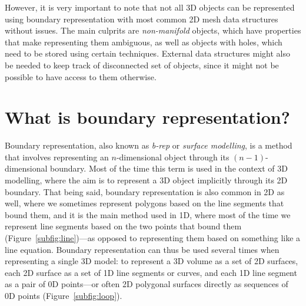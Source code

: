 However, it is very important to note that not all 3D objects can be represented using boundary representation with most common 2D mesh data structures without issues.
The main culprits are \emph{non-manifold} objects, which have properties that make representing them ambiguous, as well as objects with holes, which need to be stored using certain techniques.
External data structures might also be needed to keep track of disconnected set of objects, since it might not be possible to have access to them otherwise.

\section{What is boundary representation?}

Boundary representation, also known as \emph{b-rep} or \emph{surface modelling}, is a method that involves representing an \(n\)-dimensional object through its \((n-1)\)-dimensional boundary.
Most of the time this term is used in the context of 3D modelling, where the aim is to represent a 3D object implicitly through its 2D boundary.
That being said, boundary representation is also common in 2D as well, where we sometimes represent polygons based on the line segments that bound them, and it is the main method used in 1D, where most of the time we represent line segments based on the two points that bound them (Figure~\ref{subfig:line})---as opposed to representing them based on something like a line equation.
Boundary representation can thus be used several times when representing a single 3D model: to represent a 3D volume as a set of 2D surfaces, each 2D surface as a set of 1D line segments or curves, and each 1D line segment as a pair of 0D points---or often 2D polygonal surfaces directly as sequences of 0D points (Figure~\ref{subfig:loop}).

